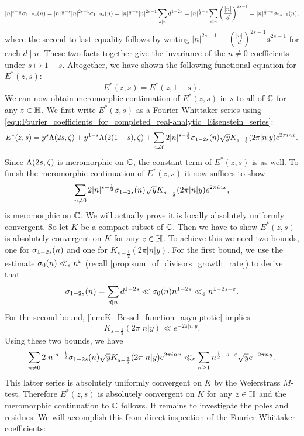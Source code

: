       \[
        |n|^{s-\frac{1}{2}}\sigma_{1-2s}(n) = |n|^{\frac{1}{2}-s}|n|^{2s-1}\sigma_{1-2s}(n) = |n|^{\frac{1}{2}-s}|n|^{2s-1}\sum_{d \mid n}d^{1-2s} = |n|^{\frac{1}{2}-s}\sum_{d \mid n}\left(\frac{|n|}{d}\right)^{2s-1} = |n|^{\frac{1}{2}-s}\sigma_{2s-1}(n),
      \]
      where the second to last equality follows by writing $|n|^{2s-1} = \left(\frac{|n|}{d}\right)^{2s-1}d^{2s-1}$ for each $d \mid n$. These two facts together give the invariance of the $n \neq 0$ coefficients under $s \mapsto 1-s$. Altogether, we have shown the following functional equation for $E^{\ast}(z,s)$:
      \[
        E^{\ast}(z,s) = E^{\ast}(z,1-s).
      \]
      We can now obtain meromorphic continuation of $E^{\ast}(z,s)$ in $s$ to all of $\mathbb{C}$ for any $z \in \mathbb{H}$. We first write $E^{\ast}(z,s)$ as a Fourier-Whittaker series using \cref{equ:Fourier_coefficients_for_completed_real-analytic_Eisenstein_series}:
      \[
        E^{\ast}(z,s) = y^{s}\Lambda(2s,\zeta)+y^{1-s}\Lambda(2(1-s),\zeta)+\sum_{n \neq 0}2|n|^{s-\frac{1}{2}}\sigma_{1-2s}(n)\sqrt{y}K_{s-\frac{1}{2}}(2\pi|n|y)e^{2\pi inx}.
      \]
      Since $\Lambda(2s,\zeta)$ is meromorphic on $\mathbb{C}$, the constant term of $E^{\ast}(z,s)$ is as well. To finish the meromorphic continuation of $E^{\ast}(z,s)$ it now suffices to show
      \[
        \sum_{n \neq 0}2|n|^{s-\frac{1}{2}}\sigma_{1-2s}(n)\sqrt{y}K_{s-\frac{1}{2}}(2\pi|n|y)e^{2\pi inx},
      \]
      is meromorphic on $\mathbb{C}$. We will actually prove it is locally absolutely uniformly convergent. So let $K$ be a compact subset of $\mathbb{C}$. Then we have to show $E^{\ast}(z,s)$ is absolutely convergent on $K$ for any $z \in \mathbb{H}$. To achieve this we need two bounds, one for $\sigma_{1-2s}(n)$ and one for $K_{s-\frac{1}{2}}(2\pi|n|y)$. For the first bound, we use the estimate $\sigma_{0}(n) \ll_{\varepsilon} n^{\varepsilon}$ (recall \cref{prop:sum_of_divisors_growth_rate}) to derive that
      \[
        \sigma_{1-2s}(n) = \sum_{d \mid n}d^{1-2s} \ll \sigma_{0}(n)n^{1-2s} \ll_{\varepsilon}n^{1-2s+\varepsilon}.
      \]
      For the second bound, \cref{lem:K_Bessel_function_asymptotic} implies
      \[
        K_{s-\frac{1}{2}}(2\pi|n|y) \ll e^{-2\pi|n|y}.
      \]
      Using these two bounds, we have
      \begin{equation}\label{equ:non-constant_Fourier_coefficient_bound_non-holomorphic_Eisenstein_series}
        \sum_{n \neq 0}2|n|^{s-\frac{1}{2}}\sigma_{1-2s}(n)\sqrt{y}K_{s-\frac{1}{2}}(2\pi|n|y)e^{2\pi inx} \ll_{\varepsilon} \sum_{n \ge 1}n^{\frac{1}{2}-s+\varepsilon}\sqrt{y}e^{-2\pi ny}.
      \end{equation}
      This latter series is absolutely uniformly convergent on $K$ by the Weierstrass $M$-test. Therefore $E^{\ast}(z,s)$ is absolutely convergent on $K$ for any $z \in \mathbb{H}$ and the meromorphic continuation to $\mathbb{C}$ follows. It remains to investigate the poles and residues. We will accomplish this from direct inspection of the Fourier-Whittaker coefficients:

